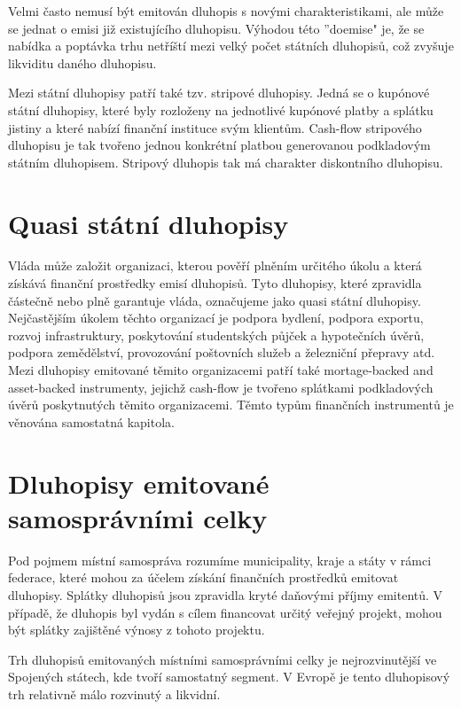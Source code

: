 \documentclass[a4paper]{book}
\begin{document}
Velmi často nemusí být emitován dluhopis s novými charakteristikami, ale může se jednat o emisi již existujícího dluhopisu. Výhodou této ''doemise" je, že se nabídka a poptávka trhu netříští mezi velký počet státních dluhopisů, což zvyšuje likviditu daného dluhopisu.

Mezi státní dluhopisy patří také tzv. stripové dluhopisy. Jedná se o kupónové státní dluhopisy, které byly rozloženy na jednotlivé kupónové platby a splátku jistiny a které nabízí finanční instituce svým klientům. Cash-flow stripového dluhopisu je tak tvořeno jednou konkrétní platbou generovanou podkladovým státním dluhopisem. Stripový dluhopis tak má charakter diskontního dluhopisu.

\section{Quasi státní dluhopisy}

Vláda může založit organizaci, kterou pověří plněním určitého úkolu a která získává finanční prostředky emisí dluhopisů. Tyto dluhopisy, které zpravidla částečně nebo plně garantuje vláda, označujeme jako quasi státní dluhopisy. Nejčastějším úkolem těchto organizací je podpora bydlení, podpora exportu, rozvoj infrastruktury, poskytování studentských půjček a hypotečních úvěrů, podpora zemědělství, provozování poštovních služeb a železniční přepravy atd. Mezi dluhopisy emitované těmito organizacemi patří také mortage-backed and asset-backed instrumenty, jejichž cash-flow je tvořeno splátkami podkladových úvěrů poskytnutých těmito organizacemi. Těmto typům finančních instrumentů je věnována samostatná kapitola.

\section{Dluhopisy emitované samosprávními celky}

Pod pojmem místní samospráva rozumíme municipality, kraje a státy v rámci federace, které mohou za účelem získání finančních prostředků emitovat dluhopisy. Splátky dluhopisů jsou zpravidla kryté daňovými příjmy emitentů. V případě, že dluhopis byl vydán s cílem financovat určitý veřejný projekt, mohou být splátky zajištěné výnosy z tohoto projektu.

Trh dluhopisů emitovaných místními samosprávními celky je nejrozvinutější ve Spojených státech, kde tvoří samostatný segment. V Evropě je tento dluhopisový trh relativně málo rozvinutý a likvidní.
\end{document}
